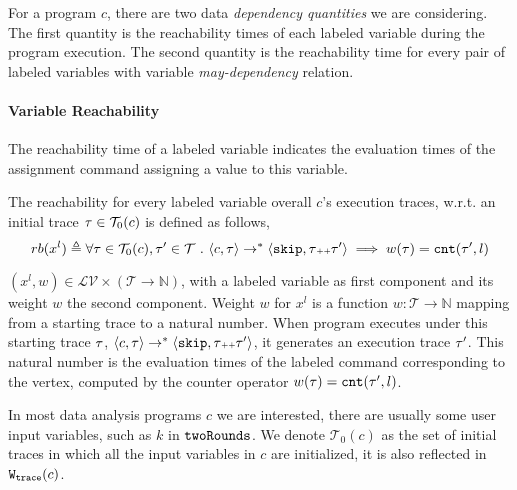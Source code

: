 For a program $c$, there are two data \emph{dependency quantities} we are considering.
The first quantity is the reachability times of each labeled variable during the program execution.
The second quantity is the reachability time for every pair of labeled variables with variable \emph{may-dependency} relation.
\paragraph*{Variable Reachability}
The reachability time of a labeled variable indicates the evaluation times of the assignment command assigning a value to this variable.  
\begin{defn}
  \label{def:adapt-var_reachability}
The reachability for every labeled variable overall $c$'s execution traces,
w.r.t. an initial trace $\mathtt{\tau} \in \mathcal{T}_0(c)$ is defined as follows,
\[
  rb(x^l) \triangleq \forall \mathtt{\tau} \in \mathcal{T}_0(c), \mathtt{\tau}' \in \mathcal{T} ~.~ \langle {c}, \mathtt{\tau} \rangle \to^{*} \langle \mathtt{skip}, \mathtt{\tau}{\scriptscriptstyle ++}\mathtt{\tau}' \rangle 
  \implies w(\mathtt{\tau}) = \mathtt{cnt}(\mathtt{\tau}', l) 
  \]
\end{defn}
%
$(x^l, w) \in \mathcal{LV} \times (\mathcal{T} \to \mathbb{N})$,
with a labeled variable as first component and
its weight $w$ the second component.
Weight $w$ for
$x^l$ is a function $w : \mathcal{T} \to \mathbb{N}$
mapping from a starting trace to a natural number.
When program executes under this starting trace $\mathtt{\tau}$,
$\langle {c}, \mathtt{\tau} \rangle \to^{*} \langle \mathtt{skip}, \mathtt{\tau}{\scriptscriptstyle ++}\mathtt{\tau}' \rangle $, it generates an execution trace $\mathtt{\tau}'$.
This natural number is the evaluation times of the labeled command corresponding to the vertex, 
computed by the counter operator $w(\mathtt{\tau}) = \mathtt{cnt}(\mathtt{\tau}', l)$.


In most data analysis programs $c$ we are interested, there are usually some user input variables, such as $k$ in $\mathtt{twoRounds}$. 
We denote $\mathcal{T}_0(c)$ as the set of initial traces in which all the input variables in $c$ are initialized, it is also reflected in $\mathtt{{W_{trace}}}({c})$.    
